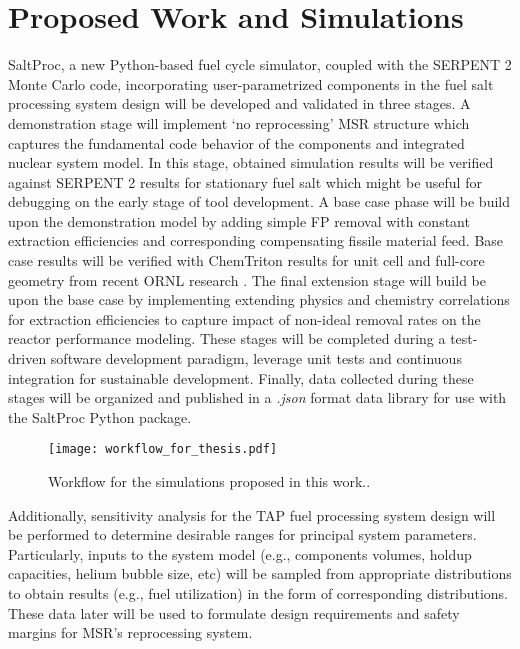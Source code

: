 \section{Proposed Work and Simulations}
SaltProc, a new Python-based fuel cycle simulator, coupled with
the SERPENT 2 Monte Carlo code, incorporating user-parametrized 
components in the fuel salt processing system design will be 
developed and validated in three stages. A demonstration stage will 
implement ‘no reprocessing’ \gls{MSR} structure which captures the 
fundamental code behavior of the components and integrated nuclear 
system model. In this stage, obtained simulation results will be 
verified against SERPENT 2 results for stationary fuel salt which 
might be useful for debugging on the early stage of tool development.
A base case phase will be build upon the demonstration model by 
adding simple \gls{FP} removal with constant extraction efficiencies 
and corresponding compensating fissile material feed. Base case 
results will be 
verified with ChemTriton results for unit cell and full-core 
geometry from recent \gls{ORNL} research 
\cite{betzler_two-dimensional_2016, betzler_assessment_2017}.
The final extension stage will build be upon the base case by 
implementing extending physics and chemistry correlations for 
extraction efficiencies to capture impact of non-ideal 
removal rates on the reactor performance modeling. These 
stages will be completed during a test-driven software 
development paradigm, leverage unit tests and 
continuous integration for sustainable development. Finally, 
data collected during these stages will be organized and 
published in a \textit{.json} format data library for use 
with the SaltProc Python package.
\begin{figure}[ht!] %
  \centering
  \texttt{[image: workflow\_for\_thesis.pdf]} 
  \caption{Workflow for the simulations proposed in this work..}
  \label{fig:workflow}
\end{figure}

Additionally, sensitivity analysis for the \gls{TAP} fuel processing 
system design will be performed to determine desirable ranges 
for principal system parameters. Particularly, inputs to the 
system model (e.g., components volumes, holdup capacities, helium 
bubble size, etc) will be sampled from appropriate 
distributions to obtain results (e.g., fuel utilization) in the 
form of corresponding distributions. These data later will be used
to formulate design requirements and safety margins for 
\gls{MSR}'s reprocessing system.


